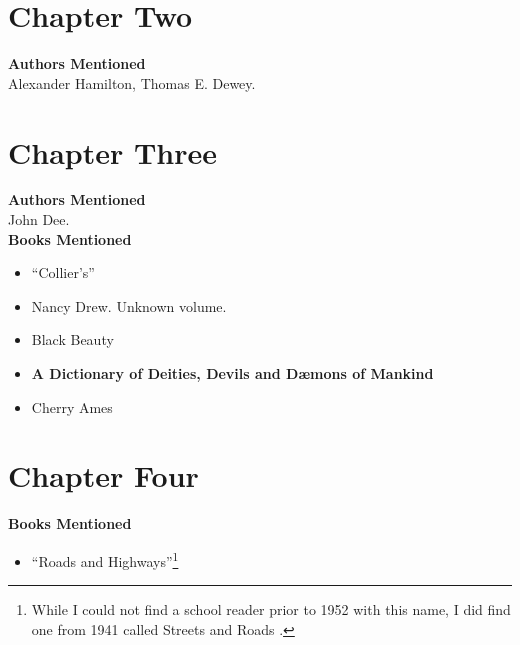 \documentclass[12pt,makeidx]{extreport}
\begin{document}
\section{Chapter Two}
\textbf{Authors Mentioned}\\
Alexander Hamilton, Thomas E. Dewey.

\section{Chapter Three}
\textbf{Authors Mentioned}\\
John Dee.
\\


\hspace{-1.5em}\textbf{Books Mentioned}
\begin{itemize}
\item ``Collier’s'' \cite{1952b}
\item Nancy Drew. Unknown volume.\cite{NancyDrew}
\item Black Beauty \cite{Sewell1887}
\item \textbf{A Dictionary of Deities, Devils and Dæmons of Mankind} \cite{St.Phalle}
\item Cherry Ames \cite{WellsPre1952}
\end{itemize}

\section{Chapter Four}
\textbf{Books Mentioned}\\
\begin{itemize}
\item ``Roads and Highways''\footnote{While I could not find a school reader prior to 1952 with this name, I did find one from 1941 called Streets and Roads \cite{Gray1941}.} \cite{UnknownRH}
\end{itemize}
\end{document}
